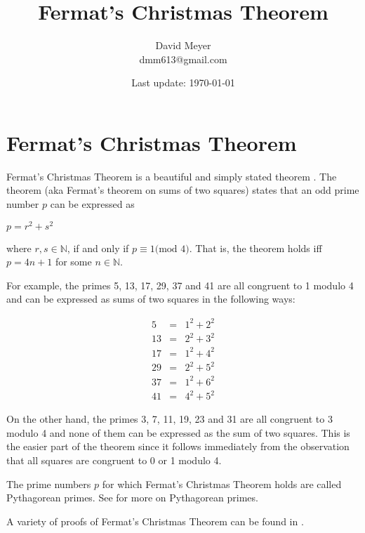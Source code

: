 \documentclass{article}
\title{Fermat's Christmas Theorem}
\author{David Meyer \\ dmm613@gmail.com}
\date{Last update: \today}
\theoremstyle{definition}
\begin{document}
\maketitle

\section{Fermat's Christmas Theorem}

\noindent
Fermat's Christmas Theorem is a beautiful and simply stated
theorem \cite{wiki:christmas_theorem}. The theorem (aka Fermat's
theorem on sums of two squares) states that an odd prime number
$p$ can be expressed as

\bigskip
\begin{center}
\scalebox{1.25} {$p = r^{2} + s^{2}$}
\end{center}
\bigskip

\noindent
where $r,s \in \mathbb{N}$, if and only if $p \equiv 1 \textrm{
(mod $4$)}$. That is, the theorem holds iff $p = 4n + 1$ for some
$n \in \mathbb{N}$.

\bigskip
\noindent
For example, the primes 5, 13, 17, 29, 37 and 41 are all
congruent to 1 modulo 4 and can be expressed as sums of two
squares in the following ways:

\begin{equation*}
\begin{array}{rcll} 
5   &=& 1^{2} + 2^{2}   \\
13  &=& 2^{2} + 3^{2}   \\
17  &=& 1^{2} + 4^{2}   \\
29  &=& 2^{2} + 5^{2}   \\
37  &=& 1^{2} + 6^{2}   \\
41  &=& 4^{2} + 5^{2}
\end{array}
\end{equation*}


\bigskip
\noindent
On the other hand, the primes 3, 7, 11, 19, 23 and 31 are all
congruent to 3 modulo 4 and none of them can be expressed as the
sum of two squares. This is the easier part of the theorem since
it follows immediately from the observation that all squares are
congruent to 0 or 1 modulo 4.

\bigskip
\noindent
The prime numbers $p$ for which Fermat's Christmas Theorem holds
are called Pythagorean primes.  See
\cite{wiki:pythagorean_primes} for more on Pythagorean primes.

\bigskip
\noindent
A variety of proofs of Fermat's Christmas Theorem can be found in
\cite{wiki:christmas_theorem_proofs}.
%
%
%
\end{document}
